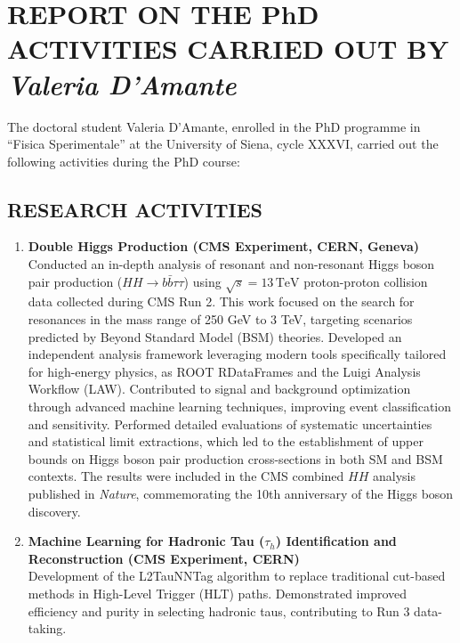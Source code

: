 \documentclass[12pt,a4paper,oneside]{extarticle}
\begin{document}
\pagestyle{default_page}

\section*{REPORT ON THE PhD ACTIVITIES CARRIED OUT BY \textit{Valeria D'Amante}}


The doctoral student Valeria D'Amante, enrolled in the PhD programme in “Fisica Sperimentale” at the University of Siena, cycle XXXVI, carried out the following activities during the PhD course:

\subsection*{RESEARCH ACTIVITIES}
\begin{enumerate}
    \item \textbf{Double Higgs Production (CMS Experiment, CERN, Geneva)}\\
    Conducted an in-depth analysis of resonant and non-resonant Higgs boson pair production ($HH \to b\bar{b}\tau\tau$) using $ \sqrt{s} = 13\,\textrm{TeV} $ proton-proton collision data collected during CMS Run 2. This work focused on the search for resonances in the mass range of 250 GeV to 3 TeV, targeting scenarios predicted by Beyond Standard Model (BSM) theories. Developed an independent analysis framework leveraging modern tools specifically tailored for high-energy physics, as ROOT RDataFrames and the Luigi Analysis Workflow (LAW). Contributed to signal and background optimization through advanced machine learning techniques, improving event classification and sensitivity. Performed detailed evaluations of systematic uncertainties and statistical limit extractions, which led to the establishment of upper bounds on Higgs boson pair production cross-sections in both SM and BSM contexts. The results were included in the CMS combined $HH$ analysis published in \textit{Nature}, commemorating the 10th anniversary of the Higgs boson discovery.

    \item \textbf{Machine Learning for Hadronic Tau ($\tau_h$) Identification and Reconstruction (CMS Experiment, CERN)}\\
    Development of the L2TauNNTag algorithm to replace traditional cut-based methods in High-Level Trigger (HLT) paths. Demonstrated improved efficiency and purity in selecting hadronic taus, contributing to Run 3 data-taking.



\end{enumerate}
\end{document}
